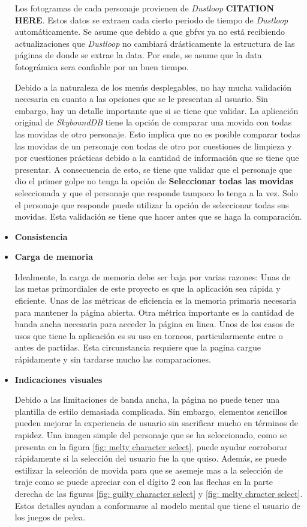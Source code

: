 \begin{itemize}
    Los fotogramas de cada personaje provienen de \textit{Dustloop} \textbf{CITATION HERE}. Estos datos se extraen cada cierto periodo de tiempo de \textit{Dustloop} automáticamente. Se asume que debido a que \gls{gbfvs} ya no está recibiendo actualizaciones que \textit{Dustloop} no cambiará drásticamente la estructura de las páginas de donde se extrae la data. Por ende, se asume que la data fotográmica sera confiable por un buen tiempo.

    Debido a la naturaleza de los menús desplegables, no hay mucha validación necesaria en cuanto a las opciones que se le presentan al usuario. Sin embargo, hay un detalle importante que si se tiene que validar. La aplicación original de \textit{SkyboundDB} tiene la opción de comparar una movida con todas las movidas de otro personaje. Esto implica que no es posible comparar todas las movidas de un personaje con todas de otro por cuestiones de limpieza y por cuestiones prácticas debido a la cantidad de información que se tiene que presentar. A consecuencia de esto, se tiene que validar que el personaje que dio el primer golpe no tenga la opción de \textbf{Seleccionar todas las movidas} seleccionada y que el personaje que responde tampoco lo tenga a la vez. Solo el personaje que responde puede utilizar la opción de seleccionar todas sus movidas. Esta validación se tiene que hacer antes que se haga la comparación.
    \item \textbf{Consistencia}
    \item \textbf{Carga de memoria}
    
    Idealmente, la carga de memoria debe ser baja por varias razones: Unas de las metas primordiales de este proyecto es que la aplicación sea rápida y eficiente. Unas de las métricas de eficiencia es la memoria primaria necesaria para mantener la página abierta. Otra métrica importante es la cantidad de banda ancha necesaria para acceder la página en linea. Unos de los casos de usos que tiene la aplicación es su uso en torneos, particularmente entre o antes de partidas. Esta circunstancia requiere que la pagina cargue rápidamente y sin tardarse mucho las comparaciones.  

    \item \textbf{Indicaciones visuales}
    
    Debido a las limitaciones de banda ancha, la página no puede tener una plantilla de estilo demasiada complicada. Sin embargo, elementos sencillos pueden mejorar la experiencia de usuario sin sacrificar mucho en términos de rapidez. Una imagen simple del personaje que se ha seleccionado, como se presenta en la figura \ref{fig: melty character select}, puede ayudar corroborar rápidamente si la selección del usuario fue la que quiso. Además, se puede estilizar la selección de movida para que se asemeje mas a la selección de traje como se puede apreciar con el dígito $2$ con las flechas en la parte derecha de las figuras \ref{fig: guilty character select} y \ref{fig: melty chracter select}. Estos detalles ayudan a conformarse al modelo mental que tiene el usuario de los juegos de pelea.
\end{itemize}